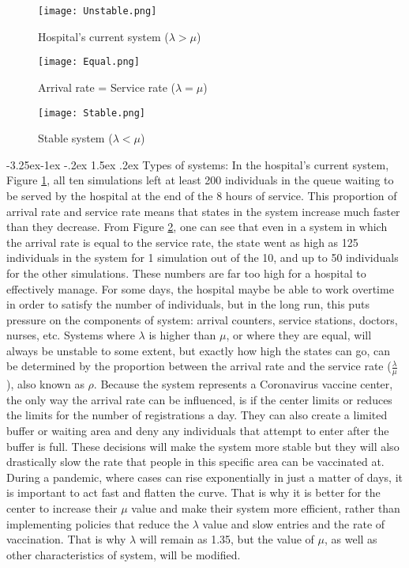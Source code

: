 \documentclass[11pt]{article}
\makeatletter
\renewcommand\subsection{\@startsection{subsection}{2}{\z@}%
                                         {-3.25ex\@plus -1ex \@minus -.2ex}%
                                         {1.5ex \@plus .2ex}%
                                         {\normalfont\fontfamily{phv}\fontsize{14}{17}\bfseries}}
\makeatother
\begin{document}
\FloatBarrier
\begin{figure}[h!]
    \centering
    \texttt{[image: Unstable.png]}
    \caption{Hospital's current system ($\lambda > \mu$)}
    \label{unstable}
\end{figure}

\begin{figure}[h!]
    \centering
    \texttt{[image: Equal.png]}
    \caption{Arrival rate = Service rate ($\lambda = \mu$)}
    \label{equal}
\end{figure}

\begin{figure}[h!]
    \centering
    \texttt{[image: Stable.png]}
    \caption{Stable system ($\lambda < \mu$)}
    \label{stable}
\end{figure}
\FloatBarrier

\subsection{Types of systems:} \label{s:numerical}
In the hospital's current system, Figure \ref{unstable}, all ten simulations left at least 200 individuals in the queue waiting to be served by the hospital at the end of the 8 hours of service. This proportion of arrival rate and service rate means that states in the system increase much faster than they decrease. From Figure \ref{equal}, one can see that even in a system in which the arrival rate is equal to the service rate, the state went as high as 125 individuals in the system for 1 simulation out of the 10, and up to 50 individuals for the other simulations. These numbers are far too high for a hospital to effectively manage. For some days, the hospital maybe be able to work overtime in order to satisfy the number of individuals, but in the long run, this puts pressure on the components of system: arrival counters, service stations, doctors, nurses, etc. Systems where $\lambda$ is higher than $\mu$, or where they are equal, will always be unstable to some extent, but exactly how high the states can go, can be determined by the proportion between the arrival rate and the service rate ($\frac{\lambda}{\mu}$), also known as $\rho$. Because the system represents a Coronavirus vaccine center, the only way the arrival rate can be influenced, is if the center limits or reduces the limits for the number of registrations a day. They can also create a limited buffer or waiting area and deny any individuals that attempt to enter after the buffer is full. These decisions will make the system more stable but they will also drastically slow the rate that people in this specific area can be vaccinated at. During a pandemic, where cases can rise exponentially in just a matter of days, it is important to act fast and flatten the curve. That is why it is better for the center to increase their $\mu$ value and make their system more efficient, rather than implementing policies that reduce the $\lambda$ value and slow entries and the rate of vaccination. That is why $\lambda$ will remain as 1.35, but the value of $\mu$, as well as other characteristics of system, will be modified. 
\end{document}
